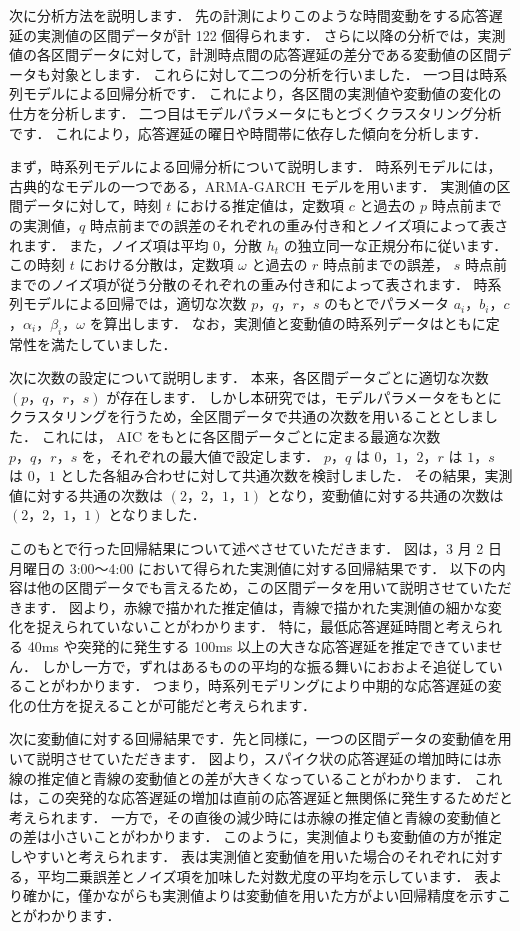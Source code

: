 \documentclass[a4j]{jarticle}
\begin{document}
次に分析方法を説明します．
先の計測によりこのような時間変動をする応答遅延の実測値の区間データが計 122 個得られます．
さらに以降の分析では，実測値の各区間データに対して，計測時点間の応答遅延の差分である変動値の区間データも対象とします．
これらに対して二つの分析を行いました．
一つ目は時系列モデルによる回帰分析です．
これにより，各区間の実測値や変動値の変化の仕方を分析します．
二つ目はモデルパラメータにもとづくクラスタリング分析です．
これにより，応答遅延の曜日や時間帯に依存した傾向を分析します．

まず，時系列モデルによる回帰分析について説明します．
時系列モデルには，古典的なモデルの一つである，ARMA-GARCH モデルを用います．
実測値の区間データに対して，時刻 $t$ における推定値は，定数項 $c$ と過去の $p$ 時点前までの実測値，$q$ 時点前までの誤差のそれぞれの重み付き和とノイズ項によって表されます．
また，ノイズ項は平均 $0$，分散 $h_t$ の独立同一な正規分布に従います．
この時刻 $t$ における分散は，定数項 $\omega$ と過去の $r$ 時点前までの誤差， $s$ 時点前までのノイズ項が従う分散のそれぞれの重み付き和によって表されます．
時系列モデルによる回帰では，適切な次数 $p，q，r，s$ のもとでパラメータ $a_i$，$b_i$，$c$，$\alpha_i$，$\beta_i$，$\omega$ を算出します．
なお，実測値と変動値の時系列データはともに定常性を満たしていました．

次に次数の設定について説明します．
本来，各区間データごとに適切な次数 $(p，q，r，s)$ が存在します．
しかし本研究では，モデルパラメータをもとにクラスタリングを行うため，全区間データで共通の次数を用いることとしました．
これには， AIC をもとに各区間データごとに定まる最適な次数 $p，q，r，s$ を，それぞれの最大値で設定します．
$p，q$ は $0，1，2$，$r$ は $1$，$s$ は $0，1$ とした各組み合わせに対して共通次数を検討しました．
その結果，実測値に対する共通の次数は $(2，2，1，1)$ となり，変動値に対する共通の次数は $(2，2，1，1)$ となりました．

このもとで行った回帰結果について述べさせていただきます．
図は，3 月 2 日月曜日の 3:00～4:00 において得られた実測値に対する回帰結果です．
以下の内容は他の区間データでも言えるため，この区間データを用いて説明させていただきます．
図より，赤線で描かれた推定値は，青線で描かれた実測値の細かな変化を捉えられていないことがわかります．
特に，最低応答遅延時間と考えられる 40ms や突発的に発生する 100ms 以上の大きな応答遅延を推定できていません．
しかし一方で，ずれはあるものの平均的な振る舞いにおおよそ追従していることがわかります．
つまり，時系列モデリングにより中期的な応答遅延の変化の仕方を捉えることが可能だと考えられます．

次に変動値に対する回帰結果です．先と同様に，一つの区間データの変動値を用いて説明させていただきます．
図より，スパイク状の応答遅延の増加時には赤線の推定値と青線の変動値との差が大きくなっていることがわかります．
これは，この突発的な応答遅延の増加は直前の応答遅延と無関係に発生するためだと考えられます．
一方で，その直後の減少時には赤線の推定値と青線の変動値との差は小さいことがわかります．
このように，実測値よりも変動値の方が推定しやすいと考えられます．
表は実測値と変動値を用いた場合のそれぞれに対する，平均二乗誤差とノイズ項を加味した対数尤度の平均を示しています．
表より確かに，僅かながらも実測値よりは変動値を用いた方がよい回帰精度を示すことがわかります．
\end{document}
